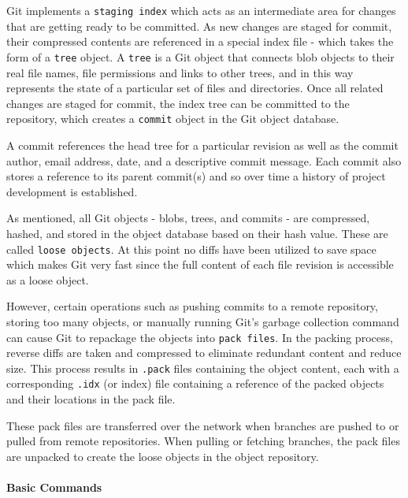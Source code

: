 Git implements a \lstinline{staging index} which acts as an intermediate area for changes that are getting ready to be committed. As new changes are staged for commit, their compressed contents are referenced in a special index file - which takes the form of a \lstinline{tree} object. A \lstinline{tree} is a Git object that connects blob objects to their real file names, file permissions and links to other trees, and in this way represents the state of a particular set of files and directories. Once all related changes are staged for commit, the index tree can be committed to the repository, which creates a \lstinline{commit} object in the Git object database.

A commit references the head tree for a particular revision as well as the commit author, email address, date, and a descriptive commit message. Each commit also stores a reference to its parent commit(s) and so over time a history of project development is established.

As mentioned, all Git objects - blobs, trees, and commits - are compressed, hashed, and stored in the object database based on their hash value. These are called \lstinline{loose objects}. At this point no diffs have been utilized to save space which makes Git very fast since the full content of each file revision is accessible as a loose object.

However, certain operations such as pushing commits to a remote repository, storing too many objects, or manually running Git's garbage collection command can cause Git to repackage the objects into \lstinline{pack files}. In the packing process, reverse diffs are taken and compressed to eliminate redundant content and reduce size. This process results in \lstinline{.pack} files containing the object content, each with a corresponding \lstinline{.idx} (or index) file containing a reference of the packed objects and their locations in the pack file.

These pack files are transferred over the network when branches are pushed to or pulled from remote repositories. When pulling or fetching branches, the pack files are unpacked to create the loose objects in the object repository.

\paragraph{Basic Commands}

